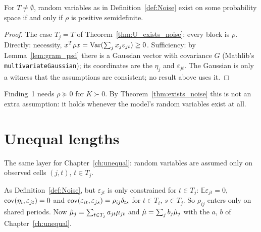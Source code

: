 \begin{theorem}\label{thm:exists_noise}
  \leanok
  For $T \neq \emptyset$, random variables as in Definition~\ref{def:Noise}
  exist on some probability space if and only if $\rho$ is positive
  semidefinite.
\end{theorem}
\begin{proof}
  \leanok
  The case $T_j = T$ of Theorem~\ref{thm:U_exists_noise}: every block is
  $\rho$. Directly: necessity, $x^T\rho x = \operatorname{Var}(\sum_j x_j\varepsilon_{jt}) \ge 0$.
  Sufficiency: by Lemma~\ref{lem:gram_psd} there is a Gaussian vector with
  covariance $G$ (Mathlib's \texttt{multivariateGaussian}); its coordinates
  are the $\eta_j$ and $\varepsilon_{jt}$. The Gaussian is only a witness
  that the assumptions are consistent; no result above uses it.
\end{proof}

\begin{remark}\label{rem:moments_psd}
  Finding~1 needs $\rho \succeq 0$ for $K \succ 0$. By
  Theorem~\ref{thm:exists_noise} this is not an extra assumption: it holds
  whenever the model's random variables exist at all.
\end{remark}

\section{Unequal lengths}

The same layer for Chapter~\ref{ch:unequal}: random variables are assumed
only on observed cells $(j,t)$, $t \in T_j$.

\begin{definition}\label{def:U_Noise}
  \leanok
  As Definition~\ref{def:Noise}, but $\varepsilon_{jt}$ is only constrained
  for $t \in T_j$: $\mathbb E\varepsilon_{jt} = 0$, $\operatorname{cov}(\eta_i,\varepsilon_{jt}) = 0$
  and $\operatorname{cov}(\varepsilon_{it},\varepsilon_{js}) = \rho_{ij}\delta_{ts}$ for
  $t \in T_i$, $s \in T_j$. So $\rho_{ij}$ enters only on shared periods.
  Now $\hat\mu_j = \sum_{t\in T_j} a_{jt}\mu_{jt}$ and $\hat\mu = \sum_j b_j\hat\mu_j$
  with the $a$, $b$ of Chapter~\ref{ch:unequal}.
\end{definition}

